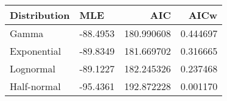 \begin{tabular}{llrr}
\toprule
Distribution &      MLE &         AIC &      AICw \\
\midrule
       Gamma & -88.4953 &  180.990608 &  0.444697 \\
 Exponential & -89.8349 &  181.669702 &  0.316665 \\
   Lognormal & -89.1227 &  182.245326 &  0.237468 \\
 Half-normal & -95.4361 &  192.872228 &  0.001170 \\
\bottomrule
\end{tabular}
